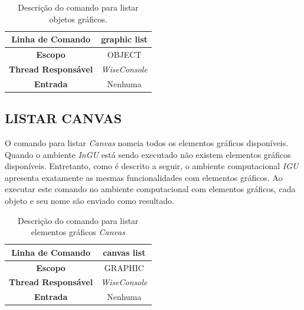 \begin{center}
	\begin{table}[!htbp]
		\begin{tabularx}{\textwidth}{c|X}
			\toprule
			\textbf{Linha de Comando} & \multicolumn{1}{c}{graphic list} \\
			\midrule
			\textbf{Escopo} & \multicolumn{1}{c}{OBJECT} \\
			\hline
			\textbf{Thread Responsável} & \multicolumn{1}{c}{\textit{WiseConsole}} \\
			\hline
			\textbf{Entrada} & \multicolumn{1}{c}{Nenhuma} \\
			\bottomrule
		\end{tabularx}
		\caption{Descrição do comando para listar objetos gráficos.}
		\label{tab:graphic_list}
	\end{table}
\end{center}

\subsection{LISTAR CANVAS}\label{sec:canvas_list}

O comando para listar \textit{Canvas} nomeia todos os elementos gráficos disponíveis. Quando o ambiente \textit{InGU} está sendo executado não existem elementos gráficos disponíveis. Entretanto, como é descrito a seguir, o ambiente computacional \textit{IGU} apresenta exatamente as mesmas funcionalidades com elementos gráficos. Ao executar este comando no ambiente computacional com elementos gráficos, cada objeto e seu nome são enviado como resultado.

\begin{center}
	\begin{table}[!htbp]
		\begin{tabularx}{\textwidth}{c|X}
			\toprule
			\textbf{Linha de Comando} & \multicolumn{1}{c}{canvas list} \\
			\midrule
			\textbf{Escopo} & \multicolumn{1}{c}{GRAPHIC} \\
			\hline
			\textbf{Thread Responsável} & \multicolumn{1}{c}{\textit{WiseConsole}} \\
			\hline
			\textbf{Entrada} & \multicolumn{1}{c}{Nenhuma} \\
			\bottomrule
		\end{tabularx}
		\caption{Descrição do comando para listar elementos gráficos \textit{Canvas}}
		\label{tab:canvas_list}
	\end{table}
\end{center}

